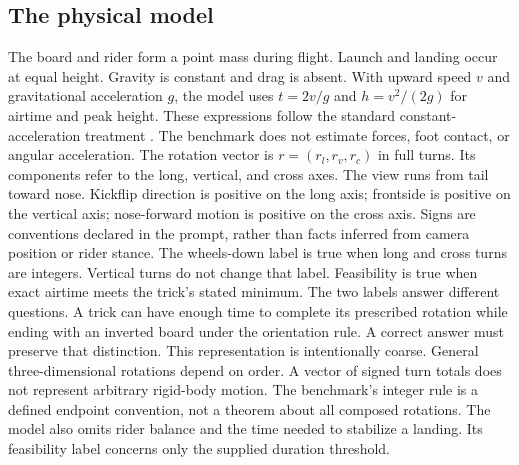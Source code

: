 \documentclass{article}
\begin{document}
\subsection{The physical model}
The board and rider form a point mass during flight. Launch and landing occur at equal height. Gravity is constant and drag is absent. With upward speed $v$ and gravitational acceleration $g$, the model uses $t=2v/g$ and $h=v^2/(2g)$ for airtime and peak height. These expressions follow the standard constant-acceleration treatment \citep{openstax}. The benchmark does not estimate forces, foot contact, or angular acceleration.
The rotation vector is $r=(r_l,r_v,r_c)$ in full turns. Its components refer to the long, vertical, and cross axes. The view runs from tail toward nose. Kickflip direction is positive on the long axis; frontside is positive on the vertical axis; nose-forward motion is positive on the cross axis. Signs are conventions declared in the prompt, rather than facts inferred from camera position or rider stance.
The wheels-down label is true when long and cross turns are integers. Vertical turns do not change that label. Feasibility is true when exact airtime meets the trick's stated minimum. The two labels answer different questions. A trick can have enough time to complete its prescribed rotation while ending with an inverted board under the orientation rule. A correct answer must preserve that distinction.
This representation is intentionally coarse. General three-dimensional rotations depend on order. A vector of signed turn totals does not represent arbitrary rigid-body motion. The benchmark's integer rule is a defined endpoint convention, not a theorem about all composed rotations. The model also omits rider balance and the time needed to stabilize a landing. Its feasibility label concerns only the supplied duration threshold.
\end{document}
